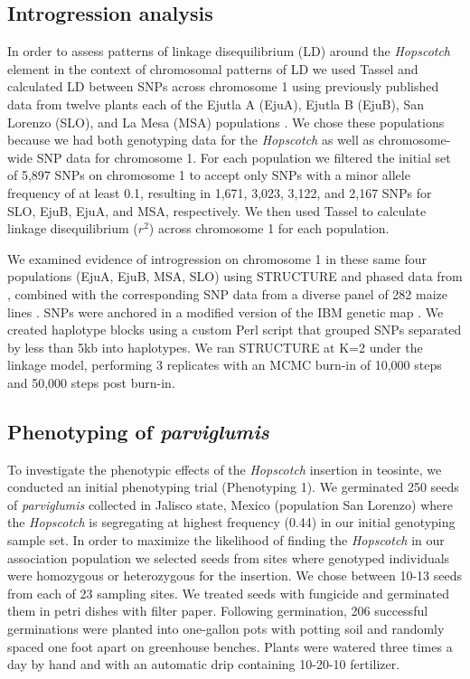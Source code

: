 \documentclass[11pt]{article}
\begin{document}
\begin{linenumbers}
\begin{flushleft}
\subsection*{Introgression analysis}

In order to assess patterns of linkage disequilibrium (LD) around the \emph{Hopscotch} element in the context of chromosomal patterns of LD we used Tassel \citep{Bradbury2007} and calculated LD between SNPs across chromosome 1 using previously published data from twelve plants each of the Ejutla A (EjuA), Ejutla B (EjuB), San Lorenzo (SLO), and La Mesa (MSA) populations \citep{Pyhajarvi2013}. We chose these populations because we had both genotyping data for the \emph{Hopscotch} as well as chromosome-wide SNP data for chromosome 1. For each population we filtered the initial set of 5,897 SNPs on chromosome 1 to accept only SNPs with a minor allele frequency of at least 0.1, resulting in 1,671, 3,023, 3,122, and 2,167 SNPs for SLO, EjuB, EjuA, and MSA, respectively. We then used Tassel \citep{Bradbury2007} to calculate linkage disequilibrium ($r^{2}$) across chromosome 1 for each population. 

We examined evidence of introgression on chromosome 1 in these same four populations (EjuA, EjuB, MSA, SLO) using STRUCTURE \citep{Falush2003} and phased data from \citet{Pyhajarvi2013}, combined with the corresponding SNP data from a diverse panel of 282 maize lines \citep{Cook2012}. SNPs were anchored in a modified version of the IBM genetic map \citep{Gerke2013}. We created haplotype blocks using a custom Perl script that grouped SNPs separated by less than 5kb into haplotypes. We ran STRUCTURE at K=2 under the linkage model, performing 3 replicates with an MCMC burn-in of 10,000 steps and 50,000 steps post burn-in.

\subsection*{Phenotyping of \emph{parviglumis}}

To investigate the phenotypic effects of the \emph{Hopscotch} insertion in teosinte, we conducted an initial phenotyping trial (Phenotyping 1). We germinated 250 seeds of \emph{parviglumis} collected in Jalisco state, Mexico (population San Lorenzo) \citep{Hufford2010} where the \emph{Hopscotch} is segregating at highest frequency (0.44) in our initial genotyping sample set. In order to maximize the likelihood of finding the \emph{Hopscotch} in our association population we selected seeds from sites where genotyped individuals were homozygous or heterozygous for the insertion. We chose between 10-13 seeds from each of 23 sampling sites. We treated seeds with fungicide and germinated them in petri dishes with filter paper. Following germination, 206 successful germinations were planted into one-gallon pots with potting soil and randomly spaced one foot apart on greenhouse benches. Plants were watered three times a day by hand and with an automatic drip containing 10-20-10 fertilizer. 


\end{flushleft}
\end{linenumbers}
\end{document}
